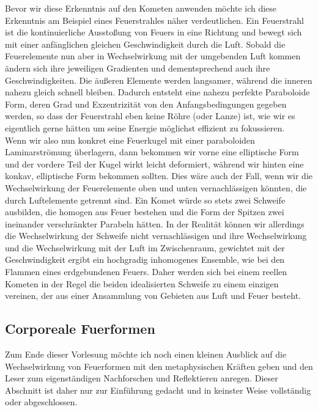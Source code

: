 \documentclass[a5paper,8pt]{book}
\begin{document}
Bevor wir diese Erkenntnis auf den Kometen anwenden möchte ich diese Erkenntnis am Beispiel eines Feuerstrahles näher 
verdeutlichen. Ein Feuerstrahl ist die kontinuierliche Ausstoßung von Feuers in eine Richtung und bewegt sich mit einer 
anfänglichen gleichen Geschwindigkeit durch die Luft. Sobald die Feuerelemente nun aber in Wechselwirkung mit der umgebenden
Luft kommen ändern sich ihre jeweiligen Gradienten und dementsprechend auch ihre Geschwindigkeiten. Die äußeren Elemente 
werden langsamer, während die inneren nahezu gleich schnell bleiben. Dadurch entsteht eine nahezu perfekte Paraboloide 
Form, deren Grad und Exzentrizität von den Anfangsbedingungen gegeben werden, so dass der Feuerstrahl eben keine Röhre 
(oder Lanze) ist, wie wir es eigentlich gerne hätten um seine Energie möglichst effizient zu fokussieren.\\

Wenn wir also nun konkret eine Feuerkugel mit einer paraboloiden Laminarströmung überlagern, dann bekommen wir vorne eine 
elliptische Form und der vordere Teil der Kugel wirkt leicht deformiert, während wir hinten eine konkav, elliptische Form 
bekommen sollten. Dies wäre auch der Fall, wenn wir die Wechselwirkung der Feuerelemente oben und unten vernachlässigen 
könnten, die durch Luftelemente getrennt sind. Ein Komet würde so stets zwei Schweife ausbilden, die homogen aus Feuer 
bestehen und die Form der Spitzen zwei ineinander verschränkter Parabeln hätten.
In der Realität können wir allerdings die Wechselwirkung der Schweife nicht vernachlässigen und ihre Wechselwirkung und die 
Wechselwirkung mit der Luft im Zwischenraum, gewichtet mit der Geschwindigkeit ergibt ein hochgradig inhomogenes Ensemble,
wie bei den Flammen eines erdgebundenen Feuers. Daher werden sich bei einem reellen Kometen in der Regel die beiden 
idealisierten Schweife zu einem einzigen vereinen, der aus einer Ansammlung von Gebieten aus Luft und Feuer besteht.

\subsection{Corporeale Fuerformen}

Zum Ende dieser Vorlesung möchte ich noch einen kleinen Ausblick auf die Wechselwirkung von Feuerformen mit den 
metaphysischen Kräften geben und den Leser zum eigenständigen Nachforschen und Reflektieren anregen. Dieser Abschnitt 
ist daher nur zur Einführung gedacht und in keinster Weise vollständig oder abgeschlossen.\\
\end{document}
